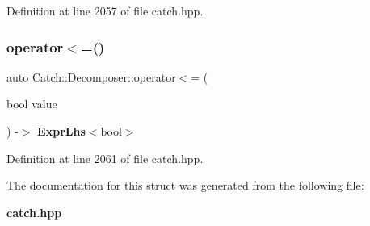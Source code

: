 Definition at line 2057 of file catch.\+hpp.

\mbox{\label{struct_catch_1_1_decomposer_aac129b94903ae1339d5709049d83613b}} 
\subsubsection{operator$<$=()\hspace{0.1cm}{\footnotesize\ttfamily [2/2]}}
{\footnotesize\ttfamily auto Catch\+::\+Decomposer\+::operator$<$= (\begin{DoxyParamCaption}\item[{bool}]{value }\end{DoxyParamCaption}) -\/$>$ \textbf{ Expr\+Lhs}$<$bool$>$ \hspace{0.3cm}{\ttfamily [inline]}}



Definition at line 2061 of file catch.\+hpp.



The documentation for this struct was generated from the following file\+:\begin{DoxyCompactItemize}
\item 
\textbf{ catch.\+hpp}\end{DoxyCompactItemize}
